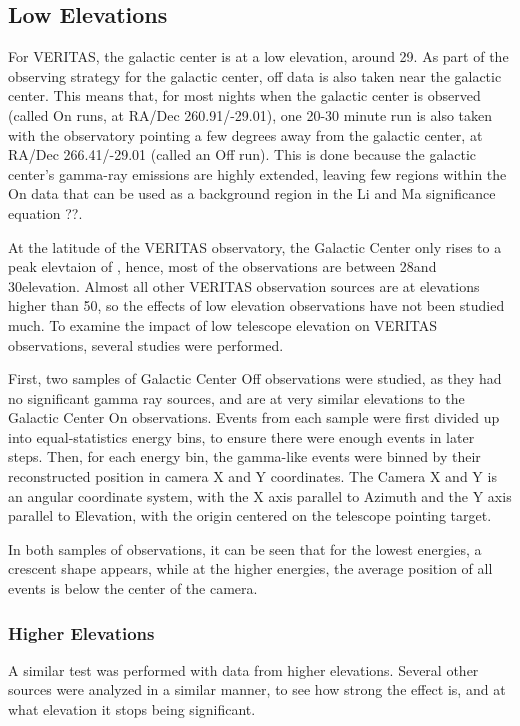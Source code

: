 \subsection{Low Elevations}
For VERITAS, the galactic center is at a low elevation, around 29\degree.
As part of the observing strategy for the galactic center, off data is also taken near the galactic center.
This means that, for most nights when the galactic center is observed (called On runs, at RA/Dec 260.91/-29.01), one 20-30 minute run is also taken with the observatory pointing a few degrees away from the galactic center, at RA/Dec 266.41/-29.01 (called an Off run).
This is done because the galactic center's gamma-ray emissions are highly extended, leaving few regions within the On data that can be used as a background region in the Li and Ma significance equation ??.

At the latitude of the VERITAS observatory, the Galactic Center only rises to a peak elevtaion of \degree, hence, most of the observations are between 28\degree and 30\degree elevation.
Almost all other VERITAS observation sources are at elevations higher than 50\degree, so the effects of low elevation observations have not been studied much.
To examine the impact of low telescope elevation on VERITAS observations, several studies were performed.

First, two samples of Galactic Center Off observations were studied, as they had no significant gamma ray sources, and are at very similar elevations to the Galactic Center On observations.
Events from each sample were first divided up into equal-statistics energy bins, to ensure there were enough events in later steps.
Then, for each energy bin, the gamma-like events were binned by their reconstructed position in camera X and Y coordinates.
The Camera X and Y is an angular coordinate system, with the X axis parallel to Azimuth and the Y axis parallel to Elevation, with the origin centered on the telescope pointing target.


In both samples of observations, it can be seen that for the lowest energies, a crescent shape appears, while at the higher energies, the average position of all events is below the center of the camera.


\subsubsection{Higher Elevations}
A similar test was performed with data from higher elevations.
Several other sources were analyzed in a similar manner, to see how strong the effect is, and at what elevation it stops being significant.


